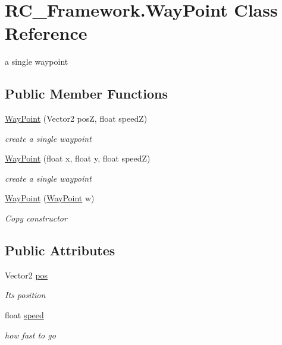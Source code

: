 \hypertarget{class_r_c___framework_1_1_way_point}{}\section{R\+C\+\_\+\+Framework.\+Way\+Point Class Reference}
\label{class_r_c___framework_1_1_way_point}


a single waypoint  


\subsection*{Public Member Functions}
\begin{DoxyCompactItemize}
\item 
\mbox{\hyperlink{class_r_c___framework_1_1_way_point_a2867a1184b66d64965e6fea2645a6ac0}{Way\+Point}} (Vector2 posZ, float speedZ)
\begin{DoxyCompactList}\small\item\em create a single waypoint \end{DoxyCompactList}\item 
\mbox{\hyperlink{class_r_c___framework_1_1_way_point_a9fb5f10082c779e78b1406a3287746f1}{Way\+Point}} (float x, float y, float speedZ)
\begin{DoxyCompactList}\small\item\em create a single waypoint \end{DoxyCompactList}\item 
\mbox{\hyperlink{class_r_c___framework_1_1_way_point_a006bd4ae61f616afdd70e2007cb0efdb}{Way\+Point}} (\mbox{\hyperlink{class_r_c___framework_1_1_way_point}{Way\+Point}} w)
\begin{DoxyCompactList}\small\item\em Copy constructor \end{DoxyCompactList}\end{DoxyCompactItemize}
\subsection*{Public Attributes}
\begin{DoxyCompactItemize}
\item 
Vector2 \mbox{\hyperlink{class_r_c___framework_1_1_way_point_aeaca0c6e5aea1388b0837fb7fe6f918b}{pos}}
\begin{DoxyCompactList}\small\item\em Its position \end{DoxyCompactList}\item 
float \mbox{\hyperlink{class_r_c___framework_1_1_way_point_afa805c2ea4ded188967af6e98d0e5f0c}{speed}}
\begin{DoxyCompactList}\small\item\em how fast to go \end{DoxyCompactList}\end{DoxyCompactItemize}


